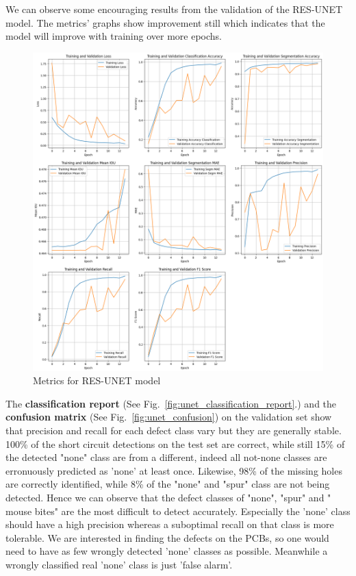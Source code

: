 \documentclass[12pt]{article}
\begin{document}
We can observe some encouraging results from the validation of the RES-UNET model. The metrics' graphs show improvement still which indicates that the model will improve with training over more epochs. 
\begin{figure}[H]
    \centering
    \includegraphics[width=\textwidth, keepaspectratio]{./graphics/RESUNET_training-history_v240618_1.png}
    \caption{Metrics for RES-UNET model}
    \label{fig:unet_training_history}
\end{figure}
\restoregeometry
\clearpage

The {\bf classification report} (See Fig.~\ref{fig:unet_classification_report}.) and the {\bf confusion matrix} (See Fig.~\ref{fig:unet_confusion}) on the validation set show that precision and recall for each defect class vary but they are generally stable. 100\% of the short circuit detections on the test set are correct, while still 15\% of the detected "none" class are from a different, indeed all not-none classes are erronuously predicted as 'none' at least once. Likewise, 98\% of the missing holes are correctly identified, while 8\% of the "none" and "spur" class are not being detected. Hence we can observe that the defect classes of "none", "spur" and " mouse bites" are the most difficult to detect accurately. Especially the 'none' class should have a high precision whereas a suboptimal recall on that class is more tolerable. We are interested in finding the defects on the PCBs, so one would need to have as few wrongly detected 'none' classes as possible. Meanwhile a wrongly classified real 'none' class is just 'false alarm'.
																			
\end{document}
